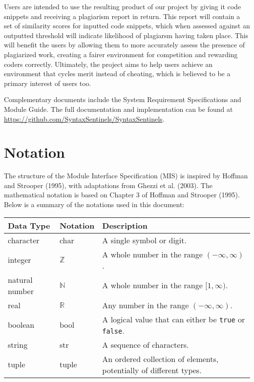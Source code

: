\documentclass[12pt, titlepage]{article}
\begin{document}
Users are intended to use the resulting product of our project by giving
it code snippets and receiving a plagiarism report in return. This report
will contain a set of similarity scores for inputted code snippets, which when
assessed against an outputted threshold will indicate likelihood of plagiarsm
having taken place. This will benefit the users by allowing them to more accurately assess the presence of plagiarized work, 
creating a fairer environment for competition and rewarding coders correctly. 
Ultimately, the project aims to help users achieve an environment that cycles merit 
instead of cheating, which is believed to be a primary interest of users too.

Complementary documents include the System Requirement Specifications
and Module Guide.  The full documentation and implementation can be
found at \url{https://github.com/SyntaxSentinels/SyntaxSentinels}. 

\section{Notation}

The structure of the Module Interface Specification (MIS) is inspired by Hoffman and Strooper (1995), with adaptations from Ghezzi et al. (2003). The mathematical notation is based on Chapter 3 of Hoffman and Strooper (1995). Below is a summary of the notations used in this document:

\begin{center}
\renewcommand{\arraystretch}{1.2}
\noindent
\begin{tabular}{l l p{8cm}} 
\toprule 
\textbf{Data Type} & \textbf{Notation} & \textbf{Description} \\ 
\midrule
character & char & A single symbol or digit. \\ 
integer & $\mathbb{Z}$ & A whole number in the range $(-\infty, \infty)$. \\ 
natural number & $\mathbb{N}$ & A whole number in the range $[1, \infty)$. \\ 
real & $\mathbb{R}$ & Any number in the range $(-\infty, \infty)$. \\ 
boolean & bool & A logical value that can either be \texttt{true} or \texttt{false}. \\
string & str & A sequence of characters. \\ 
tuple & tuple & An ordered collection of elements, potentially of different types. \\ 
\bottomrule 
\end{tabular} 
\end{center}
\end{document}
